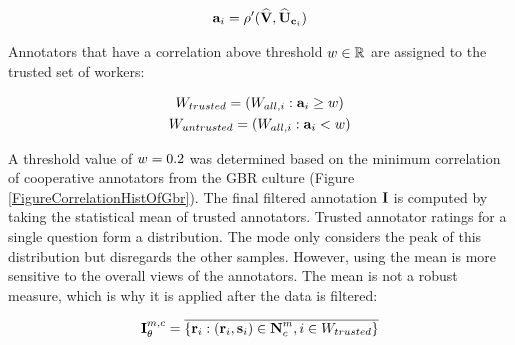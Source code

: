 \begin{gather}
\textbf{a}_{i} = \rho'(\widehat{\textbf{V}},\widehat{\textbf{U}}_{\textbf{c}_i}) 
\end{gather}

Annotators that have a correlation above threshold $w \in \mathbb{R}$ are assigned to the trusted set of workers:

\begin{gather}
W_{trusted} = (W_{all,i} : \textbf{a}_{i} \ge w) \\
W_{untrusted} = (W_{all,i} : \textbf{a}_{i} < w)
\end{gather}

A threshold value of $w = 0.2$ was determined based on the minimum correlation of cooperative annotators from the GBR culture (Figure \ref{FigureCorrelationHistOfGbr}).
The final filtered annotation $\textbf{I}$ is computed by taking the statistical mean of trusted annotators. Trusted annotator ratings for a single question form a distribution. The mode only considers the peak of this distribution but disregards the other samples. However, using the mean is more sensitive to the overall views of the annotators. The mean is not a robust measure, which is why it is applied after the data is filtered:

\begin{gather}
\textbf{I}^{m, c}_{\theta} = \overline{\{ \textbf{r}_i : (\textbf{r}_i, \textbf{s}_i) \in \textbf{N}^{m}_{c}, i \in W_{trusted} \}}
\end{gather}


